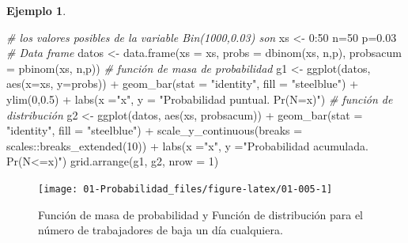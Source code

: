 \documentclass[
]{book}
\newenvironment{Shaded}{\begin{snugshade}}{\end{snugshade}}
\newcommand{\AttributeTok}[1]{\textcolor[rgb]{0.77,0.63,0.00}{#1}}
\newcommand{\CommentTok}[1]{\textcolor[rgb]{0.56,0.35,0.01}{\textit{#1}}}
\newcommand{\DecValTok}[1]{\textcolor[rgb]{0.00,0.00,0.81}{#1}}
\newcommand{\FloatTok}[1]{\textcolor[rgb]{0.00,0.00,0.81}{#1}}
\newcommand{\FunctionTok}[1]{\textcolor[rgb]{0.00,0.00,0.00}{#1}}
\newcommand{\NormalTok}[1]{#1}
\newcommand{\OtherTok}[1]{\textcolor[rgb]{0.56,0.35,0.01}{#1}}
\newcommand{\SpecialCharTok}[1]{\textcolor[rgb]{0.00,0.00,0.00}{#1}}
\newcommand{\StringTok}[1]{\textcolor[rgb]{0.31,0.60,0.02}{#1}}
\theoremstyle{definition}
\theoremstyle{definition}
\newtheorem{example}{Ejemplo}[chapter]
\theoremstyle{definition}
\theoremstyle{definition}
\theoremstyle{remark}
\begin{document}
\begin{example}
\begin{Shaded}
\begin{Highlighting}[]
\CommentTok{\# los valores posibles de la variable Bin(1000,0.03) son}
\NormalTok{xs }\OtherTok{\textless{}{-}} \DecValTok{0}\SpecialCharTok{:}\DecValTok{50}
\NormalTok{n}\OtherTok{=}\DecValTok{50}
\NormalTok{p}\OtherTok{=}\FloatTok{0.03}
\CommentTok{\# Data frame}
\NormalTok{datos }\OtherTok{\textless{}{-}} \FunctionTok{data.frame}\NormalTok{(}\AttributeTok{xs =}\NormalTok{ xs, }\AttributeTok{probs =} \FunctionTok{dbinom}\NormalTok{(xs, n,p), }
                    \AttributeTok{probsacum =} \FunctionTok{pbinom}\NormalTok{(xs, n,p))}
\CommentTok{\# función de masa de probabilidad}
\NormalTok{g1 }\OtherTok{\textless{}{-}} \FunctionTok{ggplot}\NormalTok{(datos, }\FunctionTok{aes}\NormalTok{(}\AttributeTok{x=}\NormalTok{xs, }\AttributeTok{y=}\NormalTok{probs)) }\SpecialCharTok{+} 
  \FunctionTok{geom\_bar}\NormalTok{(}\AttributeTok{stat =} \StringTok{"identity"}\NormalTok{, }\AttributeTok{fill =} \StringTok{"steelblue"}\NormalTok{) }\SpecialCharTok{+}
  \FunctionTok{ylim}\NormalTok{(}\DecValTok{0}\NormalTok{,}\FloatTok{0.5}\NormalTok{) }\SpecialCharTok{+}
  \FunctionTok{labs}\NormalTok{(}\AttributeTok{x =}\StringTok{"x"}\NormalTok{, }\AttributeTok{y =} \StringTok{"Probabilidad puntual. Pr(N=x)"}\NormalTok{)}
\CommentTok{\# función de distribución}
\NormalTok{g2 }\OtherTok{\textless{}{-}} \FunctionTok{ggplot}\NormalTok{(datos, }\FunctionTok{aes}\NormalTok{(xs, probsacum)) }\SpecialCharTok{+} 
  \FunctionTok{geom\_bar}\NormalTok{(}\AttributeTok{stat =} \StringTok{"identity"}\NormalTok{, }\AttributeTok{fill =} \StringTok{"steelblue"}\NormalTok{) }\SpecialCharTok{+}
  \FunctionTok{scale\_y\_continuous}\NormalTok{(}\AttributeTok{breaks =}\NormalTok{ scales}\SpecialCharTok{::}\FunctionTok{breaks\_extended}\NormalTok{(}\DecValTok{10}\NormalTok{)) }\SpecialCharTok{+}
  \FunctionTok{labs}\NormalTok{(}\AttributeTok{x =}\StringTok{"x"}\NormalTok{, }\AttributeTok{y =}\StringTok{"Probabilidad acumulada. Pr(N\textless{}=x)"}\NormalTok{)}
\FunctionTok{grid.arrange}\NormalTok{(g1, g2, }\AttributeTok{nrow =} \DecValTok{1}\NormalTok{)}
\end{Highlighting}
\end{Shaded}

\begin{figure}

{\centering \texttt{[image: 01-Probabilidad\_files/figure-latex/01-005-1]} 

}

\caption{Función de masa de probabilidad y Función de distribución para el número de trabajadores de baja un día cualquiera.}\label{fig:01-005}
\end{figure}


\end{example}
\end{document}
